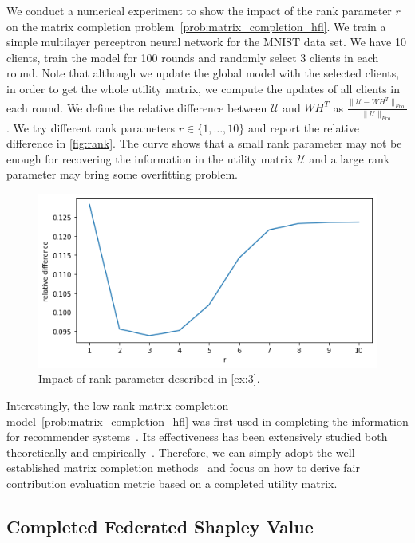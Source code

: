 \begin{example} \label{ex:3}
    We conduct a numerical experiment to show the impact of the rank parameter $r$ on the matrix completion problem~\eqref{prob:matrix_completion_hfl}. We train a simple multilayer perceptron neural network for the MNIST data set. We have 10 clients, train the model for 100 rounds and randomly select 3 clients in each round. Note that although we update the global model with the selected clients, in order to get the whole utility matrix, we compute the updates of all clients in each round. We define the relative difference between $\mathcal{U}$ and $WH^T$ as 
    $\frac{\|\mathcal{U} - WH^T\|_{Fro}}{\|\mathcal{U}\|_{Fro}}$.
    We try different rank parameters $r \in \{1, \dots, 10\}$ and report the relative difference in \autoref{fig:rank}. The curve shows that a small rank parameter may not be enough for recovering the information in the utility matrix $\mathcal{U}$ and a large rank parameter may bring some overfitting problem.  
    
    \begin{figure}[t]
        \centering
        \includegraphics[width=.7\textwidth]{./figures/rank_impact.png}
        \caption{Impact of rank parameter described in \autoref{ex:3}.}
        \label{fig:rank}
    \end{figure}
    
\end{example}

Interestingly, the low-rank matrix completion model~\eqref{prob:matrix_completion_hfl} was first used in completing the information for recommender systems~\cite{koren2009matrix}. Its effectiveness has been extensively studied both theoretically and empirically~\cite{keshavan2012efficient, sun2016guaranteed}.  Therefore, we can simply adopt the well established matrix completion methods~\cite{yu2014parallel, chin2016libmf} and focus on how to derive fair contribution evaluation metric based on a completed utility matrix.
    
\subsection{Completed Federated Shapley Value} \label{sec:7-6-4}


